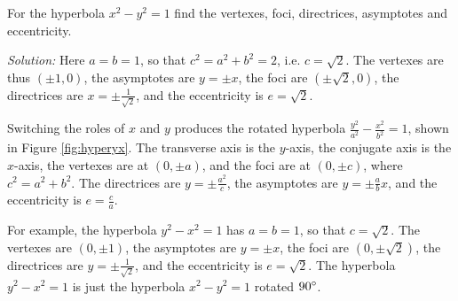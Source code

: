 \begin{exmp}
\noindent For the hyperbola $x^2 - y^2 = 1$ find the vertexes, foci,
directrices, asymptotes and eccentricity.\vspace{1mm}
\par\noindent\emph{Solution:} Here $a=b=1$, so that $c^2=a^2+b^2=2$,
i.e. $c=\sqrt{2}$. The vertexes are thus $(\pm 1,0)$, the asymptotes are
$y=\pm x$, the foci are $(\pm\sqrt{2},0)$, the directrices are
$x=\pm\frac{1}{\sqrt{2}}$, and the eccentricity is $e=\sqrt{2}$.
\end{exmp}\vspace{-3mm}
\divider
\vspace{2mm}
\noindent Switching the roles of $x$ and $y$ produces the rotated hyperbola
$\frac{y^2}{a^2} - \frac{x^2}{b^2} = 1$, shown in Figure \ref{fig:hyperyx}.
The transverse axis is the $y$-axis, the conjugate axis is the
$x$-axis, the vertexes are at $(0,\pm a)$, and the foci are at $(0,\pm c)$,
where $c^2 = a^2 + b^2$. The directrices are $y=\pm\frac{a^2}{c}$, the
asymptotes are $y=\pm\frac{a}{b}x$, and the eccentricity is $e=\frac{c}{a}$.

For example, the hyperbola $y^2 - x^2 = 1$ has $a=b=1$, so that $c=\sqrt{2}$.
The vertexes are $(0,\pm 1)$, the asymptotes are $y=\pm x$, the foci are
$(0,\pm\sqrt{2})$, the directrices are $y=\pm\frac{1}{\sqrt{2}}$, and the
eccentricity is $e=\sqrt{2}$. The hyperbola $y^2 - x^2 = 1$ is just the
hyperbola $x^2 - y^2 = 1$ rotated $90^\circ$.


